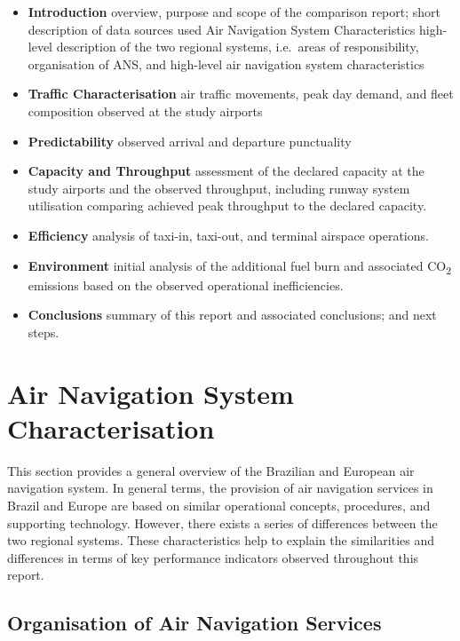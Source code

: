 \documentclass[
  a4paper,
  DIV=11,
  numbers=noendperiod]{scrreprt}
\providecommand{\tightlist}{%
  \setlength{\itemsep}{0pt}\setlength{\parskip}{0pt}}\usepackage{longtable,booktabs,array}
\begin{document}
\begin{itemize}
\tightlist
\item
  \textbf{Introduction} overview, purpose and scope of the comparison
  report; short description of data sources used Air Navigation System
  Characteristics high-level description of the two regional systems,
  i.e.~areas of responsibility, organisation of ANS, and high-level air
  navigation system characteristics
\item
  \textbf{Traffic Characterisation} air traffic movements, peak day
  demand, and fleet composition observed at the study airports
\item
  \textbf{Predictability} observed arrival and departure punctuality
\item
  \textbf{Capacity and Throughput} assessment of the declared capacity
  at the study airports and the observed throughput, including runway
  system utilisation comparing achieved peak throughput to the declared
  capacity.
\item
  \textbf{Efficiency} analysis of taxi-in, taxi-out, and terminal
  airspace operations.
\item
  \textbf{Environment} initial analysis of the additional fuel burn and
  associated CO\textsubscript{2} emissions based on the observed
  operational inefficiencies.
\item
  \textbf{Conclusions} summary of this report and associated
  conclusions; and next steps.
\end{itemize}


\hypertarget{air-navigation-system-characterisation}{%
\chapter{Air Navigation System
Characterisation}\label{air-navigation-system-characterisation}}

This section provides a general overview of the Brazilian and European
air navigation system. In general terms, the provision of air navigation
services in Brazil and Europe are based on similar operational concepts,
procedures, and supporting technology. However, there exists a series of
differences between the two regional systems. These characteristics help
to explain the similarities and differences in terms of key performance
indicators observed throughout this report.

\hypertarget{organisation-of-air-navigation-services}{%
\section{Organisation of Air Navigation
Services}\label{organisation-of-air-navigation-services}}
\end{document}
